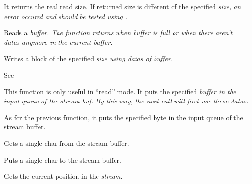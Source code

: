It returns the real read size. If returned size is different of the specified 
\it{size}, an error occured and should be tested using 
.

\label{wxstreambufreadbuf}


Reads a \it{buffer}. The function returns when \it{buffer} is full or
when there aren't datas anymore in the current buffer.



Writes a block of the specified \it{size} using datas of \it{buffer}.



See 



This function is only useful in ``read'' mode. It puts the specified \it{buffer}
in the input queue of the stream buf. By this way, the next
 call will first use these datas.



As for the previous function, it puts the specified byte in the input queue of the
stream buffer.



Gets a single char from the stream buffer.



Puts a single char to the stream buffer.



Gets the current position in the \it{stream}.

